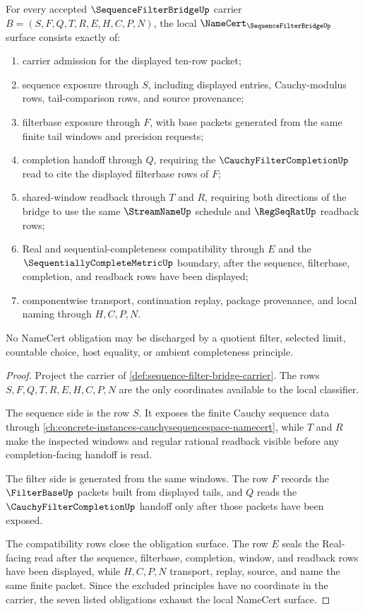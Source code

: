 \begin{theorem}\label{thm:sequence-filter-bridge-namecert-obligations}
For every accepted $\SequenceFilterBridgeUp$ carrier $B=(S,F,Q,T,R,E,H,C,P,N)$, the local $\NameCert_{\SequenceFilterBridgeUp}$ surface consists exactly of:
\begin{enumerate}
\item carrier admission for the displayed ten-row packet;
\item sequence exposure through $S$, including displayed entries, Cauchy-modulus rows, tail-comparison rows, and source provenance;
\item filterbase exposure through $F$, with base packets generated from the same finite tail windows and precision requests;
\item completion handoff through $Q$, requiring the $\CauchyFilterCompletionUp$ read to cite the displayed filterbase rows of $F$;
\item shared-window readback through $T$ and $R$, requiring both directions of the bridge to use the same $\StreamNameUp$ schedule and $\RegSeqRatUp$ readback rows;
\item Real and sequential-completeness compatibility through $E$ and the $\SequentiallyCompleteMetricUp$ boundary, after the sequence, filterbase, completion, and readback rows have been displayed;
\item componentwise transport, continuation replay, package provenance, and local naming through $H,C,P,N$.
\end{enumerate}
No NameCert obligation may be discharged by a quotient filter, selected limit, countable choice, host equality, or ambient completeness principle.
\end{theorem}
\begin{proof}
Project the carrier of \autoref{def:sequence-filter-bridge-carrier}. The rows $S,F,Q,T,R,E,H,C,P,N$ are the only coordinates available to the local classifier.

The sequence side is the row $S$. It exposes the finite Cauchy sequence data through \autoref{ch:concrete-instances-cauchysequencespace-namecert}, while $T$ and $R$ make the inspected windows and regular rational readback visible before any completion-facing handoff is read.

The filter side is generated from the same windows. The row $F$ records the $\FilterBaseUp$ packets built from displayed tails, and $Q$ reads the $\CauchyFilterCompletionUp$ handoff only after those packets have been exposed.

The compatibility rows close the obligation surface. The row $E$ seals the Real-facing read after the sequence, filterbase, completion, window, and readback rows have been displayed, while $H,C,P,N$ transport, replay, source, and name the same finite packet. Since the excluded principles have no coordinate in the carrier, the seven listed obligations exhaust the local NameCert surface.
\end{proof}


